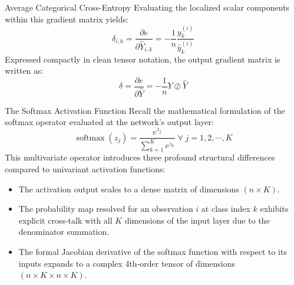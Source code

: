 \begin{frame}{Average Categorical Cross-Entropy}
	Evaluating the localized scalar components within this gradient matrix yields:
	\begin{equation*}
		\delta_{i,k} = \frac{\partial{e}}{\partial{\hat{Y}_{i,k}}} = - \frac{1}{n} \frac{y_k^{(i)}}{\hat{y}_k^{(i)}}
	\end{equation*}
	\pause
	Expressed compactly in clean tensor notation, the output gradient matrix is written as:
	\begin{equation*}
		\delta = \frac{\partial{e}}{\partial{\hat{Y}}} = - \frac{1}{n} Y \oslash \hat{Y}
	\end{equation*}	
\end{frame}

\begin{frame}{The Softmax Activation Function}
	Recall the mathematical formulation of the softmax operator evaluated at the network's output layer:
	\begin{equation*}
		\operatorname{softmax}(z_j) = \frac{e^{z_j}}{\sum_{k=1}^{K} e^{z_k}} \; \forall \; j = 1, 2, \cdots, K
	\end{equation*}
	\pause
	This multivariate operator introduces three profound structural differences compared to univariant activation functions:
	\begin{itemize}
		\item The activation output scales to a dense matrix of dimensions $(n \times K)$.
		\item The probability map resolved for an observation $i$ at class index $k$ exhibits explicit cross-talk with all $K$ dimensions of the input layer due to the denominator summation.
		\item The formal Jacobian derivative of the softmax function with respect to its inputs expands to a complex 4th-order tensor of dimensions $(n \times K \times n \times K)$.
	\end{itemize}
\end{frame}

